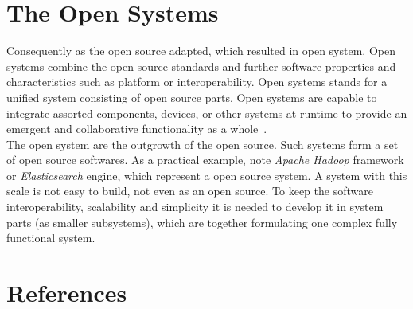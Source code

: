 \documentclass[12pt,a4paper]{article}
\theoremstyle{definition}
\begin{document}
\section{The Open Systems}

    Consequently as the open source adapted, which resulted in open system. Open systems combine the open source standards and further software properties and characteristics such as platform or interoperability. Open systems stands for a unified system consisting of open source parts. Open systems are capable to integrate assorted components, devices, or other systems at runtime to provide an emergent and collaborative functionality as a whole~\cite{opensys1}.\\

    The open system are the outgrowth of the open source. Such systems form a set of open source softwares. As a practical example, note \textit{Apache Hadoop} framework or \textit{Elasticsearch} engine, which represent a open source system. A system with this scale is not easy to build, not even as an open source. To keep the software interoperability, scalability and simplicity it is needed to develop it in system parts (as smaller subsystems), which are together formulating one complex fully functional system.

\section{References}

\begin{flushleft}
    
\end{flushleft}
\end{document}
